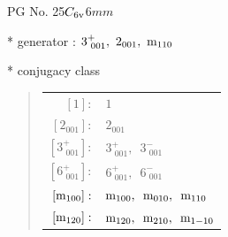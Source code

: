 \documentclass[fleqn,8pt]{jsarticle}
\begin{document}
\setcounter{MaxMatrixCols}{32}

\renewcommand{\tablename}{Table~}
\renewcommand{\figurename}{Figure~}
\begin{center}
\LARGE
PG No. 25\quad$C_{\rm 6v}$\quad$6mm$\quad[ hexagonal ]
\end{center}

* generator : $3^{+}_{\,\,001},\,\,2{}_{001},\,\,{\rm m}_{110}$

* conjugacy class
\begin{quote}
\begin{tabular}{rl}
$ [1]: $ & $ 1 $ \\
$ [2{}_{001}]: $ & $ 2{}_{001} $ \\
$ [3^{+}_{\,\,001}]: $ & $ 3^{+}_{\,\,001},\,\,\,3^{-}_{\,\,001} $ \\
$ [6^{+}_{\,\,001}]: $ & $ 6^{+}_{\,\,001},\,\,\,6^{-}_{\,\,001} $ \\
$ [{\rm m}_{100}]: $ & $ {\rm m}_{100},\,\,\,{\rm m}_{010},\,\,\,{\rm m}_{110} $ \\
$ [{\rm m}_{120}]: $ & $ {\rm m}_{120},\,\,\,{\rm m}_{210},\,\,\,{\rm m}_{1-10} $
\end{tabular}
\end{quote}
\end{document}
